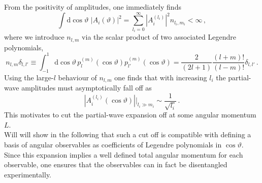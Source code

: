 \documentclass[aps,prd,reprint,nofootinbib,preprintnumbers]{revtex4}
\newcommand{\rmdx}[1]{\mbox{d} #1 \,} %
\renewcommand{\theta}{\vartheta}
\begin{document}
From the positivity of amplitudes, one immediately finds
\begin{equation}
    \int \rmdx{\cos\theta}  \, |A_i(\theta)|^2 = \sum_{l_i = 0}^\infty |A_i^{(l_i)}|^2 n_{l_i, m_i} < \infty\,,
\end{equation}
where we introduce $n_{l,m}$ via the scalar product of two associated Legendre polynomials,
\begin{equation}
    \label{eq:legendre-scalar-product}
    n_{l, m} \delta_{l, l'} \equiv \int_{-1}^1 \rmdx{\cos\theta} p_{l}^{(m)}(\cos\theta) p_{l'}^{(m)} (\cos\theta)  = \frac{2}{(2 l + 1)} \frac{(l + m)!}{(l - m)!} \delta_{l, l'}\,.
\end{equation}
Using the large-$l$ behaviour of $n_{l,m}$ one finds that with increasing $l_i$ the partial-wave amplitudes must asymptotically fall off as
\begin{equation}
    |A_i^{(l_i)}(\cos\theta)| \Big|_{l_i \gg m_i} \sim \frac{1}{\sqrt{l_i}}\,.
\end{equation}
This motivates to cut the partial-wave expansion off at some angular momentum $L$.\\

Will will show in the following that such a cut off
is compatible with defining a basis of angular observables as coefficients of Legendre polynomials in $\cos\theta$. Since this expansion implies
a well defined total angular momentum for each observable, one ensures that the observables can in fact be disentangled experimentally.\\
\end{document}
